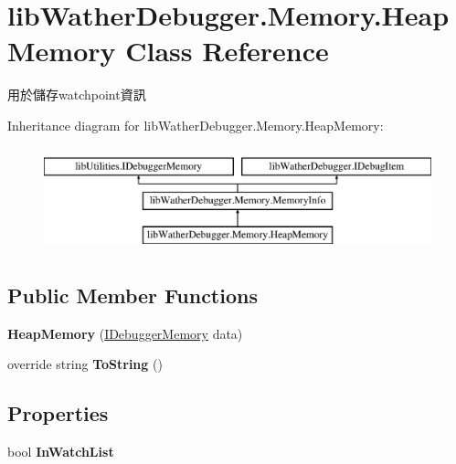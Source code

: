 \hypertarget{classlib_wather_debugger_1_1_memory_1_1_heap_memory}{\section{lib\+Wather\+Debugger.\+Memory.\+Heap\+Memory Class Reference}
\label{classlib_wather_debugger_1_1_memory_1_1_heap_memory}
}


用於儲存watchpoint資訊  


Inheritance diagram for lib\+Wather\+Debugger.\+Memory.\+Heap\+Memory\+:\begin{figure}[H]
\begin{center}
\leavevmode
\includegraphics[height=3.000000cm]{classlib_wather_debugger_1_1_memory_1_1_heap_memory}
\end{center}
\end{figure}
\subsection*{Public Member Functions}
\begin{DoxyCompactItemize}
\item 
\hypertarget{classlib_wather_debugger_1_1_memory_1_1_heap_memory_a072357bc88365d4d36a9fbd839b04441}{{\bfseries Heap\+Memory} (\hyperlink{interfacelib_utilities_1_1_i_debugger_memory}{I\+Debugger\+Memory} data)}\label{classlib_wather_debugger_1_1_memory_1_1_heap_memory_a072357bc88365d4d36a9fbd839b04441}

\item 
\hypertarget{classlib_wather_debugger_1_1_memory_1_1_heap_memory_ac34872df5592b4899d9de1862055ea80}{override string {\bfseries To\+String} ()}\label{classlib_wather_debugger_1_1_memory_1_1_heap_memory_ac34872df5592b4899d9de1862055ea80}

\end{DoxyCompactItemize}
\subsection*{Properties}
\begin{DoxyCompactItemize}
\item 
\hypertarget{classlib_wather_debugger_1_1_memory_1_1_heap_memory_a465a0fdafd665c555e08e5aa40b5e582}{bool {\bfseries In\+Watch\+List}}\label{classlib_wather_debugger_1_1_memory_1_1_heap_memory_a465a0fdafd665c555e08e5aa40b5e582}

\end{DoxyCompactItemize}


